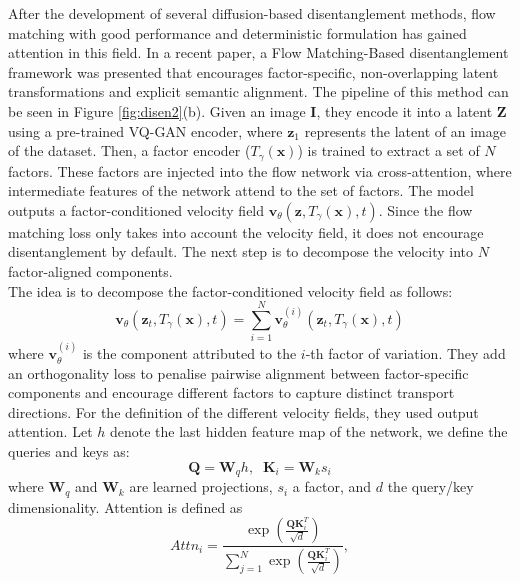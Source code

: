 \noindent 
After the development of several diffusion-based disentanglement methods, flow matching with good performance and deterministic formulation has gained attention in this field. In a recent paper, a Flow Matching-Based disentanglement framework \cite{chi2026disentangledrepresentationlearningflow} was presented that encourages factor-specific, non-overlapping latent transformations and explicit semantic alignment. The pipeline of this method can be seen in Figure \ref{fig:disen2}(b). Given an image $\mathbf{I}$, they encode it into a latent $\mathbf{Z}$ using a pre-trained VQ-GAN encoder, where $\mathbf{z}_1$ represents the latent of an image of the dataset. Then, a factor encoder ($T_{\gamma}(\mathbf{x})$) is trained to extract a set of $N$ factors. These factors are injected into the flow network via cross-attention, where intermediate features of the network attend to the set of factors. The model outputs a factor-conditioned velocity field $\mathbf{v}_{\theta}(\mathbf{z},T_{\gamma}(\mathbf{x}),t)$. Since the flow matching loss only takes into account the velocity field, it does not encourage disentanglement by default. The next step is to decompose the velocity into $N$ factor-aligned components. \\
The idea is to decompose the factor-conditioned velocity field as follows: 
\begin{equation}
     \mathbf{v}_{\theta}(\mathbf{z}_t, T_{\gamma}(\mathbf{x}), t) = \sum_{i=1}^N \mathbf{v}_{\theta}^{(i)}(\mathbf{z}_t, T_{\gamma}(\mathbf{x}), t)
\end{equation}
where $\mathbf{v}_{\theta}^{(i)}$ is the component attributed to the $i$-th factor of variation. They add an orthogonality loss to penalise pairwise alignment between factor-specific components and encourage different factors to capture distinct transport directions. For the definition of the different velocity fields, they used output attention. Let $h$ denote the last hidden feature map of the network, we define the queries and keys as: 
\begin{equation}
    \mathbf{Q} = \mathbf{W}_qh, \;\;  \mathbf{K}_i = \mathbf{W}_k s_i
\end{equation}
where $\mathbf{W}_q$ and $\mathbf{W}_k$ are learned projections, $s_i$ a factor, and $d$ the query/key dimensionality. Attention is defined as  
\begin{equation}
    Attn_i = \frac{\exp\left(\frac{\mathbf{Q}\mathbf{K}_i^T}{\sqrt{d}}\right)}{\sum_{j=1}^N \exp\left(\frac{\mathbf{Q}\mathbf{K}_i^T}{\sqrt{d}}\right)},
\end{equation}
